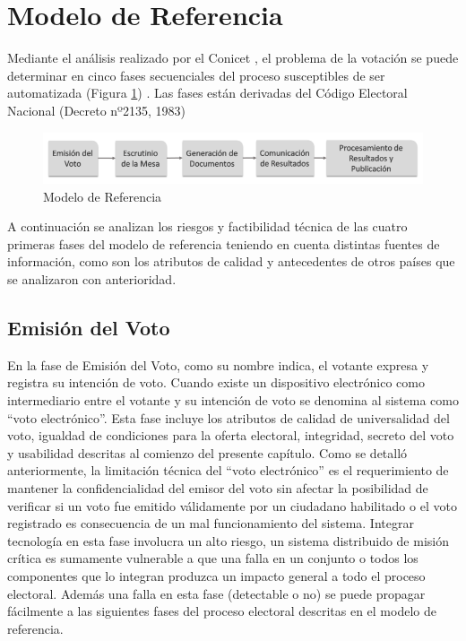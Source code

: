 \section{Modelo de Referencia}
Mediante el análisis realizado por el Conicet \cite{conicet}, el problema de la votación se puede determinar en cinco fases secuenciales del proceso susceptibles de ser automatizada (Figura \ref{graf:modeloReferencia}) . Las fases están derivadas del Código Electoral Nacional (Decreto nº2135, 1983) \cite{decreto}

\begin{figure}[h!]
    \begin{center}
        \includegraphics[width=\textwidth]{img/modeloReferencia.png}
    \end{center}
  \caption{Modelo de Referencia}
  \label{graf:modeloReferencia}
\end{figure}

A continuación se analizan los riesgos y factibilidad técnica de las cuatro primeras fases del modelo de referencia teniendo en cuenta distintas fuentes de información, como son los atributos de calidad y antecedentes de otros países que se analizaron con anterioridad. 

\subsection{Emisión del Voto} 
En la fase de Emisión del Voto, como su nombre indica, el votante expresa y registra su intención de voto. Cuando existe un dispositivo electrónico como intermediario entre el votante y su intención de voto se denomina al sistema como ``voto electrónico''. Esta fase incluye los atributos de calidad de universalidad del voto, igualdad de condiciones para la oferta electoral, integridad, secreto del voto y usabilidad descritas al comienzo del presente capítulo. Como se detalló anteriormente, la limitación técnica del ``voto electrónico'' es el requerimiento de mantener la confidencialidad del emisor del voto sin afectar la posibilidad de verificar si un voto fue emitido válidamente por un ciudadano habilitado o el voto registrado es consecuencia de un mal funcionamiento del sistema. Integrar tecnología en esta fase involucra un alto riesgo, un sistema distribuido de misión crítica es sumamente vulnerable a que una falla en un conjunto o todos los componentes que lo integran produzca un impacto general a todo el proceso electoral. Además una falla en esta fase (detectable o no) se puede propagar fácilmente a las siguientes fases del proceso electoral descritas en el modelo de referencia. 

